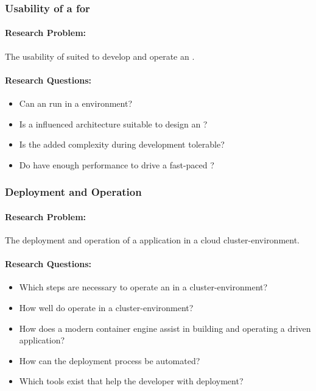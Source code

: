 \subsubsection{Usability of a \ms{} for \ogs{}} 

\paragraph{Research Problem:} The usability of \ms{} suited to develop and
operate an \og{}.

\paragraph{Research Questions:}
\begin{itemize}
  \item Can an \og{} run in a \ms{} environment?
  \item Is a \ms{} influenced architecture suitable to design an \og{}?
  \item Is the added complexity during development tolerable?
  \item Do \mss{} have enough performance to drive a fast-paced \ogs{}? 
\end{itemize}

\subsubsection{Deployment and Operation}

\paragraph{Research Problem:} The deployment and operation of a \ms{}
application in a cloud cluster-environment.

\paragraph{Research Questions:}
\begin{itemize}
  \item Which steps are necessary to operate an \og{} in a cluster-environment?
  \item How well do \ogs{} operate in a cluster-environment?
  \item How does a modern container engine assist in building and operating a
  \ms{} driven application?
  \item How can the deployment process be automated?
  \item Which tools exist that help the developer with deployment?
\end{itemize}


